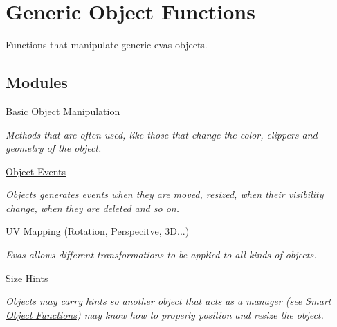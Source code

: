 \section{Generic Object Functions}
\label{group__Evas__Object__Group}


Functions that manipulate generic evas objects.  


\subsection*{Modules}
\begin{DoxyCompactItemize}
\item 
\hyperlink{group__Evas__Object__Group__Basic}{Basic Object Manipulation}


\begin{DoxyCompactList}\small\item\em Methods that are often used, like those that change the color, clippers and geometry of the object. \item\end{DoxyCompactList}

\item 
\hyperlink{group__Evas__Object__Group__Events}{Object Events}


\begin{DoxyCompactList}\small\item\em Objects generates events when they are moved, resized, when their visibility change, when they are deleted and so on. \item\end{DoxyCompactList}

\item 
\hyperlink{group__Evas__Object__Group__Map}{UV Mapping (Rotation, Perspecitve, 3D...)}


\begin{DoxyCompactList}\small\item\em Evas allows different transformations to be applied to all kinds of objects. \item\end{DoxyCompactList}

\item 
\hyperlink{group__Evas__Object__Group__Size__Hints}{Size Hints}


\begin{DoxyCompactList}\small\item\em Objects may carry hints so another object that acts as a manager (see \hyperlink{group__Evas__Smart__Object__Group}{Smart Object Functions}) may know how to properly position and resize the object. \item\end{DoxyCompactList}


\end{DoxyCompactItemize}
